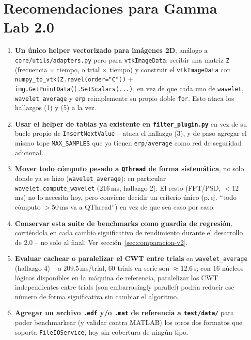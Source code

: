 \documentclass[11pt,a4paper]{article}
\begin{document}
\section{Recomendaciones para Gamma Lab 2.0}

\begin{enumerate}
  \item \textbf{Un único helper vectorizado para imágenes 2D}, análogo a
        \texttt{core/utils/adapters.py} pero para \texttt{vtkImageData}: recibir una matriz \texttt{Z}
        (frecuencia $\times$ tiempo, o trial $\times$ tiempo) y construir el \texttt{vtkImageData} con
        \texttt{numpy\_\allowbreak to\_\allowbreak vtk(Z.ravel(order="C"))} $+$
        \texttt{img.GetPointData().SetScalars(...)}, en vez de que cada uno de \texttt{wavelet},
        \texttt{wavelet\_\allowbreak average} y \texttt{erp} reimplemente su propio doble \texttt{for}. Esto
        ataca los hallazgos (1) y (5) a la vez.
  \item \textbf{Usar el helper de tablas ya existente en \texttt{filter\_\allowbreak plugin.py}} en vez de su
        bucle propio de \texttt{InsertNextValue} -- ataca el hallazgo (3), y de paso agregar el mismo tope
        \texttt{MAX\_\allowbreak SAMPLES} que ya tienen \texttt{erp}/\texttt{average} como red de seguridad
        adicional.
  \item \textbf{Mover todo cómputo pesado a \texttt{QThread} de forma sistemática}, no solo donde ya se hizo
        (\texttt{wavelet\_\allowbreak average}): en particular \texttt{wavelet.compute\_\allowbreak wavelet}
        (216\,ms, hallazgo 2). El resto (FFT/PSD, $<$12\,ms) no lo necesita hoy, pero conviene decidir un
        criterio único (p.\,ej. ``todo cómputo $>$50\,ms va a QThread'') en vez de que sea caso por caso.
  \item \textbf{Conservar esta suite de benchmarks como guardia de regresión}, corriéndola en cada cambio
        significativo de rendimiento durante el desarrollo de 2.0 -- no solo al final. Ver
        sección~\ref{sec:comparacion-v2}.
  \item \textbf{Evaluar cachear o paralelizar el CWT entre trials} en \texttt{wavelet\_\allowbreak average}
        (hallazgo 4) -- a 209.5\,ms/trial, 60 trials en serie son $\approx$12.6\,s; con 16 núcleos lógicos
        disponibles en la máquina de referencia, paralelizar los CWT independientes entre trials (son
        embarrasingly parallel) podría reducir ese número de forma significativa sin cambiar el algoritmo.
  \item \textbf{Agregar un archivo \texttt{.edf} y/o \texttt{.mat} de referencia a \texttt{test/data/}} para
        poder benchmarkear (y validar contra MATLAB) los otros dos formatos que soporta
        \texttt{FileIOService}, hoy sin cobertura de ningún tipo.
\end{enumerate}
\end{document}
